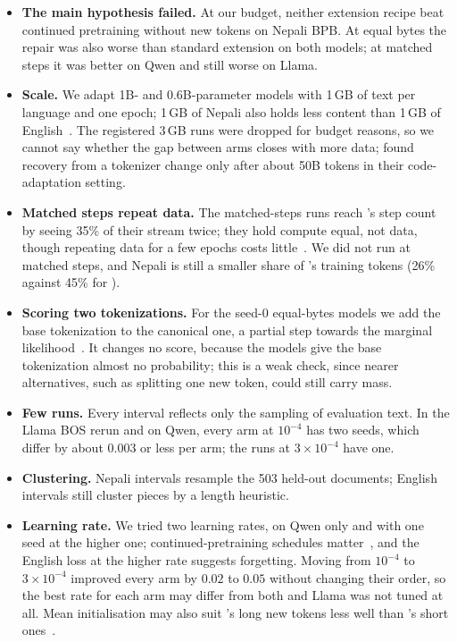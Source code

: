 \begin{itemize}
  \setlength\itemsep{0pt}
  \item \textbf{The main hypothesis failed.} At our budget, neither extension recipe beat continued pretraining without new tokens on Nepali BPB. At equal bytes the repair was also worse than standard extension on both models; at matched steps it was better on Qwen and still worse on Llama.
  \item \textbf{Scale.} We adapt 1B- and 0.6B-parameter models with 1\,GB of text per language and one epoch; 1\,GB of Nepali also holds less content than 1\,GB of English~\citep{arnett-etal-2024-bit}. The registered 3\,GB runs were dropped for budget reasons, so we cannot say whether the gap between arms closes with more data; \citet{dagan2024getting} found recovery from a tokenizer change only after about 50B tokens in their code-adaptation setting.
  \item \textbf{Matched steps repeat data.} The matched-steps \RII{} runs reach \RI{}'s step count by seeing 35\% of their stream twice; they hold compute equal, not data, though repeating data for a few epochs costs little~\citep{muennighoff2023scaling}. We did not run \RO{} at matched steps, and Nepali is still a smaller share of \RII{}'s training tokens (26\% against 45\% for \RI{}).
  \item \textbf{Scoring two tokenizations.} For the seed-0 equal-bytes models we add the base tokenization to the canonical one, a partial step towards the marginal likelihood~\citep{cao-rimell-2021-evaluate,chirkova-etal-2023-marginalize}. It changes no score, because the models give the base tokenization almost no probability; this is a weak check, since nearer alternatives, such as splitting one new token, could still carry mass.
  \item \textbf{Few runs.} Every interval reflects only the sampling of evaluation text. In the Llama BOS rerun and on Qwen, every arm at $10^{-4}$ has two seeds, which differ by about $0.003$ or less per arm; the runs at $3{\times}10^{-4}$ have one.
  \item \textbf{Clustering.} Nepali intervals resample the 503 held-out documents; English intervals still cluster pieces by a length heuristic.
  \item \textbf{Learning rate.} We tried two learning rates, on Qwen only and with one seed at the higher one; continued-pretraining schedules matter~\citep{ibrahim2024simple}, and the English loss at the higher rate suggests forgetting. Moving from $10^{-4}$ to $3{\times}10^{-4}$ improved every arm by $0.02$ to $0.05$ without changing their order, so the best rate for each arm may differ from both and Llama was not tuned at all. Mean initialisation may also suit \RII{}'s long new tokens less well than \RI{}'s short ones~\citep{joshi2026beyondinit}.

\end{itemize}

